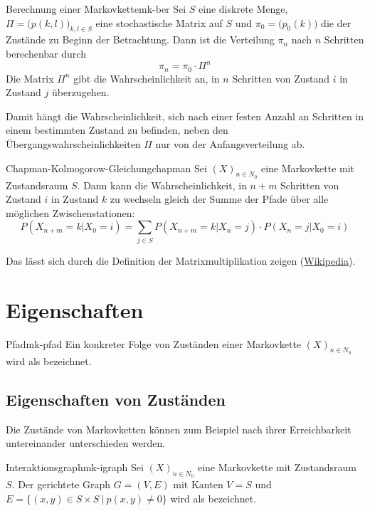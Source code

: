 \begin{theorem}{Berechnung einer Markovkette}{mk-ber}
Sei $S$ eine diskrete Menge, $\Pi = \big(p(k,l)\big)_{k,l\in S}$ eine
stochastische Matrix auf $S$ und $\pi_0 = \big(p_0(k)\big)$ die
 der Zustände zu Beginn der Betrachtung. Dann ist
die Verteilung $\pi_n$ nach $n$ Schritten berechenbar durch
\[
\pi_n = \pi_0\cdot\Pi^n
\]
Die Matrix $\Pi^n$ gibt die Wahrscheinlichkeit an, in $n$ Schritten von
Zustand $i$ in Zustand $j$ überzugehen.
\end{theorem}

Damit hängt die Wahrscheinlichkeit, sich nach einer festen Anzahl an Schritten
in einem bestimmten Zustand zu befinden, neben den Übergangswahrscheinlichkeiten
$\Pi$ nur von der Anfangsverteilung ab.

\begin{theorem}{Chapman-Kolmogorow-Gleichung}{chapman}
Sei $(X)_{n\in N_0}$ eine Markovkette mit Zustandsraum $S$. Dann kann die
Wahrscheinlichkeit, in $n+m$ Schritten von Zustand $i$ in Zustand $k$ zu
wechseln gleich der Summe der Pfade über alle möglichen Zwischenstationen:
\[
P(X_{n+m}=k|X_0=i) = \sum_{j\in S}P(X_{n+m}=k|X_n=j)\cdot P(X_n=j|X_0=i)
\]
\end{theorem}

Das lässt sich durch die Definition der Matrixmultiplikation zeigen
(\href{https://de.wikipedia.org/wiki/Chapman-Kolmogorow-Gleichung}{Wikipedia}).

\section{Eigenschaften}

\begin{definition}{Pfad}{mk-pfad}
Ein konkreter Folge von Zuständen einer Markovkette $(X)_{n\in N_0}$ wird
als  bezeichnet.
\end{definition}

\subsection{Eigenschaften von Zuständen}

Die Zustände von Markovketten können zum Beispiel nach ihrer Erreichbarkeit
untereinander unterschieden werden.

\begin{definition}{Interaktionsgraph}{mk-igraph}
Sei $(X)_{n\in N_0}$ eine Markovkette mit Zustandsraum $S$. Der gerichtete Graph
$G=(V,E)$ mit Kanten $V=S$ und $E = \{(x,y) \in S\times S\ |\ p(x,y) \ne 0\}$ wird
als  bezeichnet.
\end{definition}


